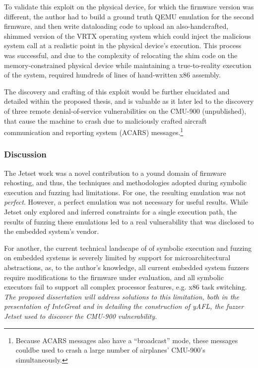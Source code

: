 To validate this exploit on the physical device, for which the firmware version was different, the author had to build a ground truth QEMU emulation for the second firmware, and then write dataloading code to upload an also-handcrafted, shimmed version of the VRTX operating system which could inject the malicious system call at a realistic point in the physical device's execution.
This process was successful, and due to the complexity of relocating the shim code on the memory-constrained physical device while maintaining a true-to-reality execution of the system, required hundreds of lines of hand-written x86 assembly.

The discovery and crafting of this exploit would be further elucidated and detailed within the proposed thesis, and is valuable as it later led to the discovery of three remote denial-of-service vulnerabilities on the CMU-900 (unpublished), that cause the machine to crash due to maliciously crafted aircraft communication and reporting system (ACARS) messages.\footnote{Because ACARS messages also have a ``broadcast'' mode, these messages couldbe used to crash a large number of airplanes' CMU-900's simultaneously.}

\subsubsection{Discussion}

The Jetset work was a novel contribution to a yound domain of firmware rehosting, and thus, the techniques and methodologies adopted during symbolic execution and fuzzing had limitations. 
For one, the resulting emulation was not \emph{perfect}.
However, a perfect emulation was not necessary for useful results.
While Jetset only explored and inferred constraints for a single execution path, the results of fuzzing these emulations led to a real vulnerability that was disclosed to the embedded system's vendor.

For another, the current technical landscape of of symbolic execution and fuzzing on embedded systems is severely limited by support for microarchitectural abstractions, as, to the author's knowledge, all current embedded system fuzzers require modifications to the firmware under evaluation, and all symbolic executors fail to support all complex processor features, e.g. x86 task switching.
\emph{The proposed dissertation will address solutions to this limitation, both in the presentation of InteGreat and in detailing the construction of yAFL, the fuzzer Jetset used to discover the CMU-900 vulnerability.}

